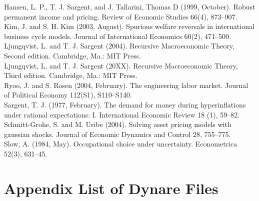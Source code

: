 \documentclass[a4paper,12pt]{scrartcl} %
\begin{document}
Hansen, L. P., T. J. Sargent, and J. Tallarini, Thomas D (1999, October). Robust permanent income and pricing. Review of Economic Studies 66(4), 873–907.\\

Kim, J. and S. H. Kim (2003, August). Spurious welfare reversals in international business cycle models. Journal of International Economics 60(2), 471–500.\\

Ljungqvist, L. and T. J. Sargent (2004). Recursive Macroeconomic Theory, Second edition. Cambridge, Ma.: MIT Press.\\

Ljungqvist, L. and T. J. Sargent (20XX). Recursive Macroeconomic Theory, Third edition. Cambridge, Ma.: MIT Press.\\

Ryoo, J. and S. Rosen (2004, February). The engineering labor market. Journal of Political Economy 112(S1), S110–S140.\\

Sargent, T. J. (1977, February). The demand for money during hyperinflations under rational expectations: I. International Economic Review 18 (1), 59–82.\\

Schmitt-Grohe, S. and M. Uribe (2004). Solving asset pricing models with gaussian shocks. Journal of Economic Dynamics and Control 28, 755–775.\\

Slow, A. (1984, May). Occupational choice under uncertainty. Econometrica 52(3), 631–45.



\clearpage
\appendix
{} %

\section{Appendix List of Dynare Files}
\end{document}
